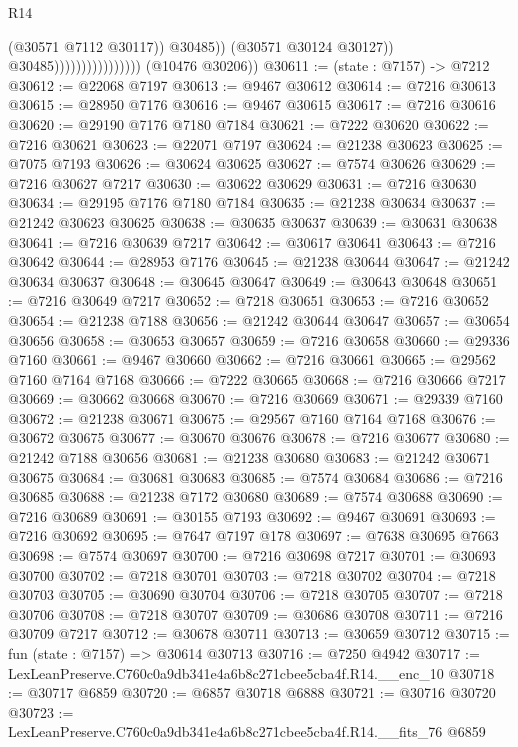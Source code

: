 \begin{lexlean}{R14}
\begin{coremodule}
                                              (@30571 @7112 @30117))
                                            @30485))
                                        (@30571 @30124 @30127))
                                      @30485))))))))))))))))
      (@10476 @30206))
@30611 := (state : @7157) -> @7212
@30612 := @22068 @7197
@30613 := @9467 @30612
@30614 := @7216 @30613
@30615 := @28950 @7176
@30616 := @9467 @30615
@30617 := @7216 @30616
@30620 := @29190 @7176 @7180 @7184
@30621 := @7222 @30620
@30622 := @7216 @30621
@30623 := @22071 @7197
@30624 := @21238 @30623
@30625 := @7075 @7193
@30626 := @30624 @30625
@30627 := @7574 @30626
@30629 := @7216 @30627 @7217
@30630 := @30622 @30629
@30631 := @7216 @30630
@30634 := @29195 @7176 @7180 @7184
@30635 := @21238 @30634
@30637 := @21242 @30623 @30625
@30638 := @30635 @30637
@30639 := @30631 @30638
@30641 := @7216 @30639 @7217
@30642 := @30617 @30641
@30643 := @7216 @30642
@30644 := @28953 @7176
@30645 := @21238 @30644
@30647 := @21242 @30634 @30637
@30648 := @30645 @30647
@30649 := @30643 @30648
@30651 := @7216 @30649 @7217
@30652 := @7218 @30651
@30653 := @7216 @30652
@30654 := @21238 @7188
@30656 := @21242 @30644 @30647
@30657 := @30654 @30656
@30658 := @30653 @30657
@30659 := @7216 @30658
@30660 := @29336 @7160
@30661 := @9467 @30660
@30662 := @7216 @30661
@30665 := @29562 @7160 @7164 @7168
@30666 := @7222 @30665
@30668 := @7216 @30666 @7217
@30669 := @30662 @30668
@30670 := @7216 @30669
@30671 := @29339 @7160
@30672 := @21238 @30671
@30675 := @29567 @7160 @7164 @7168
@30676 := @30672 @30675
@30677 := @30670 @30676
@30678 := @7216 @30677
@30680 := @21242 @7188 @30656
@30681 := @21238 @30680
@30683 := @21242 @30671 @30675
@30684 := @30681 @30683
@30685 := @7574 @30684
@30686 := @7216 @30685
@30688 := @21238 @7172 @30680
@30689 := @7574 @30688
@30690 := @7216 @30689
@30691 := @30155 @7193
@30692 := @9467 @30691
@30693 := @7216 @30692
@30695 := @7647 @7197 @178
@30697 := @7638 @30695 @7663
@30698 := @7574 @30697
@30700 := @7216 @30698 @7217
@30701 := @30693 @30700
@30702 := @7218 @30701
@30703 := @7218 @30702
@30704 := @7218 @30703
@30705 := @30690 @30704
@30706 := @7218 @30705
@30707 := @7218 @30706
@30708 := @7218 @30707
@30709 := @30686 @30708
@30711 := @7216 @30709 @7217
@30712 := @30678 @30711
@30713 := @30659 @30712
@30715 := fun (state : @7157) => @30614 @30713
@30716 := @7250 @4942
@30717 := LexLeanPreserve.C760c0a9db341e4a6b8c271cbee5cba4f.R14.__enc_10
@30718 := @30717 @6859
@30720 := @6857 @30718 @6888
@30721 := @30716 @30720
@30723 := LexLeanPreserve.C760c0a9db341e4a6b8c271cbee5cba4f.R14.__fits_76 @6859

\end{coremodule}
\end{lexlean}
